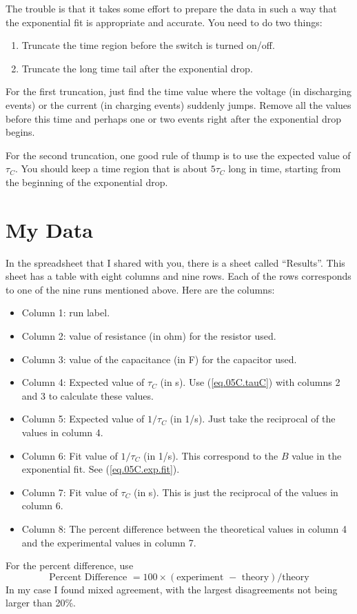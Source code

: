 The trouble is that it takes some effort to prepare the data in such a way that the exponential fit is appropriate and accurate. You need to do two things:
\begin{enumerate}
	\item Truncate the time region before the switch is turned on/off.
	\item Truncate the long time tail after the exponential drop.
\end{enumerate}
For the first truncation, just find the time value where the voltage (in discharging events) or the current (in charging events) suddenly jumps. Remove all the values before this time and perhaps one or two events right after the exponential drop begins.

For the second truncation, one good rule of thump is to use the expected value of $\tau_{C}$. You should keep a time region that is about $5\tau_{C}$ long in time, starting from the beginning of the exponential drop.
\section{My Data}
In the spreadsheet that I shared with you, there is a sheet called ``Results''. This sheet has a table with eight columns and nine rows. Each of the rows corresponds to one of the nine runs mentioned above. Here are the columns:
\begin{itemize}
	\item Column 1: run label.
	\item Column 2: value of resistance (in ohm) for the resistor used.
	\item Column 3: value of the capacitance (in F) for the capacitor used.
	\item Column 4: Expected value of $\tau_{C}$ (in s). Use (\ref{eq.05C.tauC}) with columns 2 and 3 to calculate these values.
	\item Column 5: Expected value of $1 / \tau_{C}$ (in 1/s). Just take the reciprocal of the values in column 4.
	\item Column 6: Fit value of $1 / \tau_{C}$ (in 1/s). This correspond to the $B$ value in the exponential fit. See (\ref{eq.05C.exp.fit}).
	\item Column 7: Fit value of $\tau_{C}$ (in s). This is just the reciprocal of the values in column 6.
	\item Column 8: The percent difference between the theoretical values in column 4 and the experimental values in column 7.
\end{itemize}
For the percent difference, use
\begin{equation}
	\text{Percent Difference } = 100 \times (\text{experiment } - \text{ theory}) / \text{theory}
\end{equation}
In my case I found mixed agreement, with the largest disagreements not being larger than 20\%.
